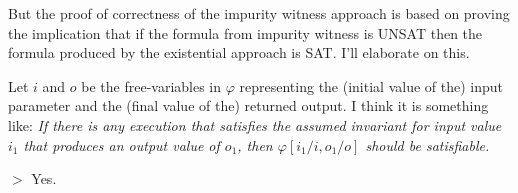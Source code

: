 \begin{enumerate}
\begin{enumerate}
But the proof of correctness of the impurity witness approach is based
on proving the implication that if the formula from impurity witness
is UNSAT then the formula produced by the existential approach is
SAT. I'll elaborate on this.

Let $i$ and $o$ be the free-variables in $\varphi$
representing the (initial value of the) input parameter and the
(final value of the) returned output. I think it is something like:
\emph{
If there is any execution that
satisfies the assumed invariant for input value $i_1$ that produces
an output value of $o_1$, then $\varphi[i_1/i,o_1/o]$ should be
satisfiable.
}

$>$ Yes.


\end{enumerate}

\end{enumerate}
